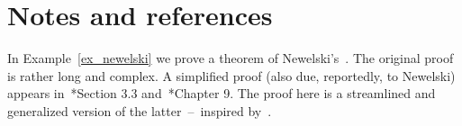 \section{Notes and references}

In Example~\ref{ex_newelski} we prove a theorem of Newelski's~\cite{Newelski}.
The original proof is rather long and complex.
A simplified proof (also due, reportedly, to Newelski) appears in~\cite{Pelaez}*{Section 3.3} and~\cite{Casanovas}*{Chapter 9}.
The proof here is a streamlined and generalized version of the latter~--~inspired by~\cite{Z16}.

